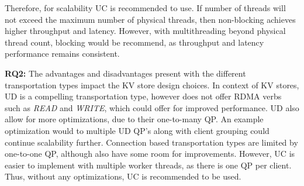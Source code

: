 Therefore, for scalability UC is recommended to use.
If number of threads will not exceed the maximum number of physical threads, then non-blocking achieves higher throughput and latency.
However, with multithreading beyond physical thread count, blocking would be recommend, as throughput and latency performance remains consistent.

\textbf{RQ2:} The advantages and disadvantages present with the different transportation types impact the KV store design choices.
In context of KV stores, UD is a compelling transportation type, however does not offer RDMA verbs such as \textit{READ} and \textit{WRITE}, which could offer for improved performance.
UD also allow for more optimizations, due to their one-to-many QP.
An example optimization would to multiple UD QP's along with client grouping could continue scalability further.
Connection based transportation types are limited by one-to-one QP, although also have some room for improvements.
However, UC is easier to implement with multiple worker threads, as there is one QP per client.
Thus, without any optimizations, UC is recommended to be used.


